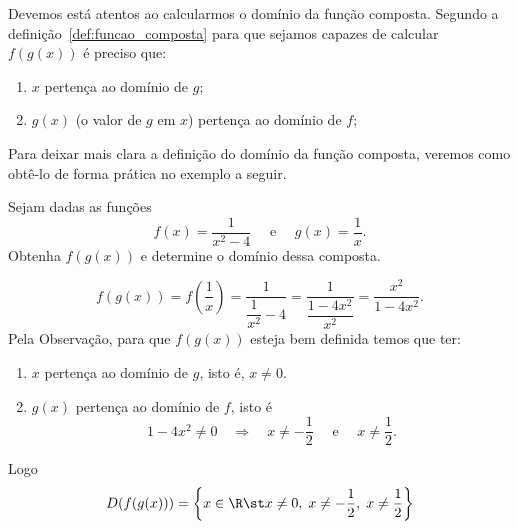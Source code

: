 \begin{observation}
  Devemos está atentos ao calcularmos o domínio da função composta. Segundo a
  definição~\ref{def:funcao_composta}
  para que sejamos capazes de calcular $f(g(x))$ é preciso que:
  \begin{enumerate}
    \item $x$ pertença ao domínio de $g$;
    \item $g(x)$ (o valor de $g$ em $x$) pertença ao domínio de $f$;
  \end{enumerate}
\end{observation}

Para deixar mais clara a definição do domínio da função composta, veremos
como obtê-lo de forma prática no exemplo a seguir.

\begin{example}
  Sejam dadas as funções
  \[
    f(x) = \frac{1}{x^2-4} \quad\text{ e }\quad
    g(x) = \frac{1}{x}.
  \]
  Obtenha $f(g(x))$ e determine o domínio dessa composta.

  \solution
  \[
    f(g(x))
    = f\left(\frac{1}{x}\right)
    = \frac{1}{\dfrac{1}{x^2}-4}
    = \frac{1}{\dfrac{1-4x^2}{x^2}}
    = \frac{x^2}{1-4x^2}.
  \]
  Pela Observação,
  para que $f(g(x))$ esteja bem definida temos que ter:
  \begin{enumerate}
    \item $x$ pertença ao domínio de $g$, isto é, $x \neq 0$.
    \item $g(x)$ pertença ao domínio de $f$, isto é
    \[
      1-4x^2 \neq 0
      \quad\Rightarrow\quad
      x \neq -\frac{1}{2}
      \quad\text{ e }\quad
      x \neq \frac{1}{2}.
    \]
  \end{enumerate}
  Logo
  \[
    D(f(g(x)))
    = \left\{
        x \in \R \st
        x \neq 0,\;
        x \neq -\frac{1}{2},\;
        x \neq  \frac{1}{2}
    \right\}
  \]
\end{example}

